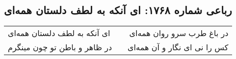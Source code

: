 \begin{center}
\section*{رباعی شماره ۱۷۶۸: ای آنکه به لطف دلستان همه‌ای}
\label{sec:1768}
\begin{longtable}{l p{0.5cm} r}
ای آنکه به لطف دلستان همه‌ای
&&
در باغ طرب سرو روان همه‌ای
\\
در ظاهر و باطن تو چون مینگرم
&&
کس را نی ای نگار و آن همه‌ای
\\
\end{longtable}
\end{center}
